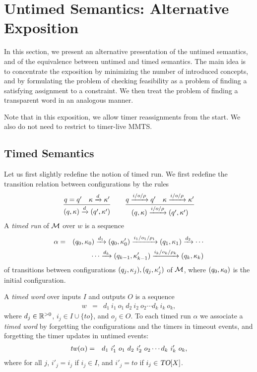 \section{Untimed Semantics: Alternative Exposition}
\label{section constraints}
In this section, we present an alternative presentation of the untimed
semantics, and of the
equivalence between untimed and timed semantics. The main idea is to concentrate
the exposition by minimizing the number of introduced concepts, and
by formulating the problem of checking feasibility as a problem
of finding a satisfying assignment to a constraint. We then treat the problem
of finding a transparent word in an analogous manner.

Note that in this exposition, we allow timer reassignments from the start.
We also do not need to restrict to timer-live MMTS.


\subsection{Timed Semantics}

Let us first slightly redefine the notion of timed run. We first redefine the
transition relation between configurations by the rules
\[
\frac{q = q' \quad \kappa \xrightarrow{d} \kappa'}{(q,\kappa) \xrightarrow{d} (q',\kappa')}
\quad\quad
  \frac{q \xrightarrow{i/o/\rho} q' \quad \kappa \xrightarrow{i/o/\rho} \kappa'}{(q,\kappa) \xrightarrow{i/o/\rho} (q',\kappa')}
\]
A \emph{timed run} of ${\mathcal M}$ over $w$ is a sequence 
\begin{eqnarray*}
\alpha & = & (q_0,\kappa_0) \xrightarrow{d_1} (q_0,\kappa_0') \xrightarrow{i_1/o_1/\rho_1} (q_1,\kappa_1) \xrightarrow{d_2} 
\cdots
\\ && \qquad \cdots
\xrightarrow{d_k} (q_{k-1},\kappa_{k-1}') \xrightarrow{i_k/o_k/\rho_k} (q_k,\kappa_k)
\end{eqnarray*}
of transitions between configurations $(q_j,\kappa_j),(q_j,\kappa_j')$ of ${\mathcal M}$, where $(q_0,\kappa_0)$ is the initial configuration.

A \emph{timed word} over inputs $I$ and outputs $O$ is a sequence
\begin{eqnarray*}
w & = &  d_1 ~ i_1 ~ o_1 ~ d_2 ~ i_2 ~ o_2 \cdots d_k ~ i_k ~ o_k,
\end{eqnarray*}
where $d_j \in {\mathbb R}^{> 0}$, $i_j \in I \cup \{ \mathit{to} \}$, and $o_j \in O$.
To each timed run $\alpha$ we associate a \emph{timed word} by forgetting the configurations and the timers
in timeout events, and forgetting the timer updates in untimed events:
\begin{eqnarray*}
\mathit{tw}(\alpha) & = & d_1 ~ i'_1 ~ o_1 ~ d_2 ~ i'_2 ~ o_2 \cdots d_k ~ i'_k ~ o_k,
\end{eqnarray*}
where for all  $j$,
$i'_j   =   i_j$ if $i_j \in I$, and
$i'_j   = \mathit{to}$ if $i_j \in \mbox{\sl TO}[X]$.

